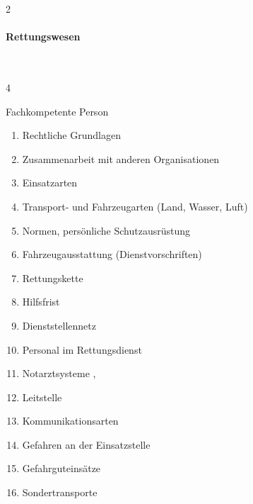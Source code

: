 \begin{WidePar}
\begin{multicols}{2}
\paragraph{Rettungswesen}~
  
  \begin{inparadesc}
    \item[Stundenanzahl:]  4
    \item[Lehrkraft:]   Fachkompetente Person
  \end{inparadesc}
  
  \begin{enumerate}\item
    
    Rechtliche Grundlagen
    \\
    \item    Zusammenarbeit mit  anderen Organisationen \dotfill  {}
    \item    Einsatzarten \dotfill {}
    \item    Transport- und Fahrzeugarten (Land,  Wasser, Luft) \dotfill {}
    \item    Normen, persönliche Schutzausrüstung \dotfill {}
    \item    Fahrzeugausstattung (Dienstvorschriften) \dotfill {}
    \item    Rettungskette \dotfill {}
    \item    Hilfsfrist \dotfill {}
    \item    Dienststellennetz 
    \item    Personal im Rettungsdienst \dotfill {}
    \item    Notarztsysteme \dotfill {},
    \item    Leitstelle \dotfill {}
    \item    Kommunikationsarten \dotfill {}
    \item    Gefahren an der Einsatzstelle \dotfill {}
    \item    Gefahrguteinsätze \dotfill {}
    \item    Sondertransporte \dotfill {}
    

\end{enumerate}
\end{multicols}
\end{WidePar}
